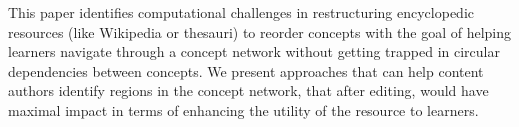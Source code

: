 This paper identifies computational challenges in restructuring encyclopedic resources (like Wikipedia or thesauri) to reorder concepts with the goal of helping learners navigate through a concept network without getting trapped in circular dependencies between concepts. We present approaches that can help content authors identify regions in the concept network, that after editing, would have maximal impact in terms of enhancing the utility of the resource to learners.
